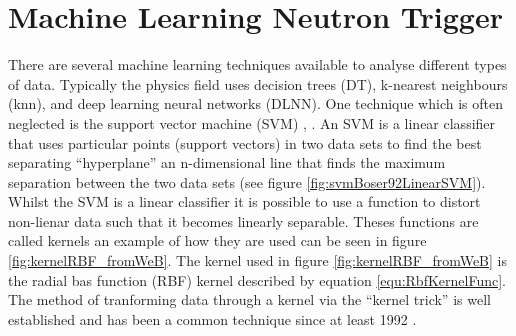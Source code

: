 \section{Machine Learning Neutron Trigger}\label{sec:MachineLearningTrigger}
There are several machine learning techniques available to analyse different types of data. Typically the physics field uses decision trees (DT), k-nearest neighbours (knn), and deep learning neural networks (DLNN). One technique which is often neglected is the support vector machine (SVM) \cite{Boser92atraining}, \cite{cortes1995support}. An SVM is a linear classifier that uses particular points (support vectors) in two data sets to find the best separating ``hyperplane'' an n-dimensional line that finds the maximum separation between the two data sets (see figure \ref{fig:svmBoser92LinearSVM}). Whilst the SVM is a linear classifier it is possible to use a function to distort non-lienar data such that it becomes linearly separable. Theses functions are called kernels an example of how they are used can be seen in figure \ref{fig:kernelRBF_fromWeB}. The kernel used in figure \ref{fig:kernelRBF_fromWeB} is the radial bas function (RBF) kernel described by equation \ref{equ:RbfKernelFunc}. The method of tranforming data through a kernel via the ``kernel trick'' is well established and has been a common technique since at least 1992 \cite{Boser92atraining}.
